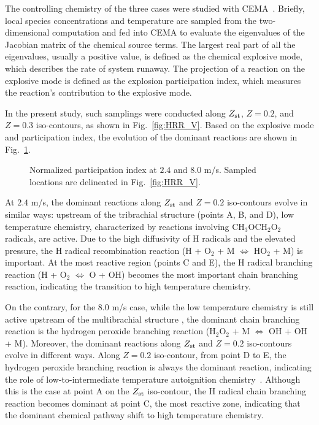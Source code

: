 \documentclass{wssci}
\begin{document}
The controlling chemistry of the three cases were studied with CEMA~\cite{lu10,shan12}.   Briefly, local species concentrations and temperature are sampled from the two-dimensional computation and fed into CEMA to evaluate the eigenvalues of the Jacobian matrix of the chemical source terms.  The largest real part of all the eigenvalues, usually a positive value, is defined as the chemical explosive mode, which describes the rate of system runaway.  The projection of a reaction on the explosive mode is defined as the explosion participation index, which measures the reaction's contribution to the explosive mode.

In the present study, such samplings were conducted along $Z_{\rm st}$, $Z = 0.2$, and $Z = 0.3$ iso-contours, as shown in Fig.~\ref{fig:HRR_V}.  Based on the explosive mode and participation index, the evolution of the dominant reactions are shown in Fig.~\ref{fig:CEMA_V}.

\begin{figure}
  \centering
  \scriptsize
  \resizebox{0.8\textwidth}{!}{}
  \resizebox{0.8\textwidth}{!}{}
  \normalsize
  \caption{Normalized participation index at $2.4$ and $8.0$ m/s.  Sampled locations are delineated in Fig.~\ref{fig:HRR_V}.}
  \label{fig:CEMA_V}
\end{figure}

At $2.4$ m/s, the dominant reactions along $Z_{\rm st}$ and $Z = 0.2$ iso-contours evolve in similar ways: upstream of the tribrachial structure (points A, B, and D), low temperature chemistry, characterized by reactions involving CH$_3$OCH$_2$O$_2$ radicals, are active.  Due to the high diffusivity of H radicals and the elevated pressure, the H radical recombination reaction (H + O$_2$ + M $\Longleftrightarrow$ HO$_2$ + M) is important.  At the most reactive region (points C and E), the H radical branching reaction (H + O$_2$ $\Longleftrightarrow$ O + OH) becomes the most important chain branching reaction, indicating the transition to high temperature chemistry.

On the contrary, for the $8.0$ m/s case, while the low temperature chemistry is still active upstream of the multibrachial structure , the dominant chain branching reaction is the hydrogen peroxide branching reaction (H$_2$O$_2$ + M $\Longleftrightarrow$ OH + OH + M).  Moreover, the dominant reactions along $Z_{\rm st}$ and $Z = 0.2$ iso-contours evolve in different ways.  Along $Z = 0.2$ iso-contour, from point D to E, the hydrogen peroxide branching reaction is always the dominant reaction, indicating the role of low-to-intermediate temperature autoignition chemistry~\cite{westbrook00}.  Although this is the case at point A on the $Z_{\rm st}$ iso-contour, the H radical chain branching reaction becomes dominant at point C, the most reactive zone, indicating that the dominant chemical pathway shift to high temperature chemistry.  
\end{document}
